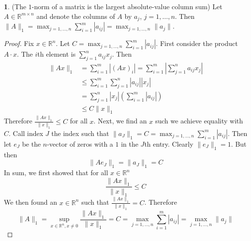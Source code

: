 \documentclass[12pt]{article}
\theoremstyle{definition}
\newcommand{\R}{\mathbb{R}}
\newcommand{\norm}[1]{\lVert#1\rVert}
\newtheorem{theorem}{\color{ForestGreen}{\textbf{Theorem}}}
\theoremstyle{definition}
\begin{document}
\begin{theorem}(The $1$-norm of a matrix is the largest absolute-value column sum)
Let $A \in \R^{m \times n }$ and denote the columns of $A$ by $a_j$, $j=1, \ldots, n$. Then $\norm{A}_1 = \max_{j=1, \ldots, n} \sum_{i=1}^{m} |a_{ij}| =  \max_{j=1, \ldots, n} \norm{a_j}$.
\end{theorem}
\begin{proof}
Fix $x \in \R^n$. Let $C = \max_{j=1, \ldots, n} \sum_{i=1}^{m} |a_{ij}|$. First consider the product $A\cdot x$. The $i$th element is $\sum_{j=1}^n a_{ij} x_j$. Then
\begin{align*}
	\norm{Ax}_1 &= \sum_{i=1}^m |(Ax)_i | = \sum_{i=1}^m |\sum_{j=1}^n a_{ij} x_j| \\
	&\leq \sum_{i=1}^m \sum_{j=1}^n |a_{ij}| |x_j| \tag{triangle inequality} \\
	&= \sum_{j=1}^n |x_j| \left(\sum_{i=1}^m |a_{ij}| \right) \tag{interchange order of summation, assumed finite} \\
	&\leq C \norm{x}_1
\end{align*}
Therefore $\frac{\norm{Ax}_1}{\norm{x}_1} \leq C$ for all $x$. Next, we find an $x$ such we achieve equality with $C$. Call index $J$ the index such that $\norm{a_J}_1 = C = \max_{j=1, \ldots, n} \sum_{i=1}^{m} |a_{ij}|$. Then let $e_J$ be the $n$-vector of zeros with a $1$ in the $J$th entry. Clearly $\norm{e_J}_1 = 1$. But then
\begin{equation}
 	\norm{A e_J}_1 = \norm{a_J}_1 = C
\end{equation} 
In sum, we first showed that for all $x \in \R^n$
\begin{equation}
	\frac{\norm{Ax}_1}{\norm{x}_1} \leq C
\end{equation}
We then found an $x \in \R^n$ such that $\frac{\norm{Ax}_1}{\norm{x}_1} = C$. Therefore 
\begin{equation}
	\norm{A}_1 = \sup_{x \in \R^n, x\neq 0} \frac{\norm{Ax}_1}{\norm{x}_1} = C = \max_{j=1, \ldots, n} \sum_{i=1}^{m} |a_{ij}| =  \max_{j=1, \ldots, n} \norm{a_j}
\end{equation}
\end{proof}
\end{document}
